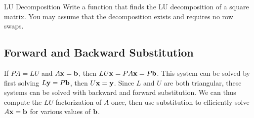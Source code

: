 \begin{problem}{LU Decomposition}
Write a function that finds the LU decomposition of a square matrix.
You may assume that the decomposition exists and requires no row swaps.
\label{prob:LU-Decomposition}
\end{problem}

\subsection*{Forward and Backward Substitution} %

If $PA = LU$ and $A\mathbf{x} = \mathbf{b}$, then $LU\mathbf{x} = PA\mathbf{x} = P\mathbf{b}$.
This system can be solved by first solving $L\mathbf{y} = P\mathbf{b}$, then $U\mathbf{x} = \mathbf{y}$.
Since $L$ and $U$ are both triangular, these systems can be solved with backward and forward substitution.
We can thus compute the $LU$ factorization of $A$ once, then use substitution to efficiently solve $A\mathbf{x}=\mathbf{b}$ for various values of $\mathbf{b}$.

